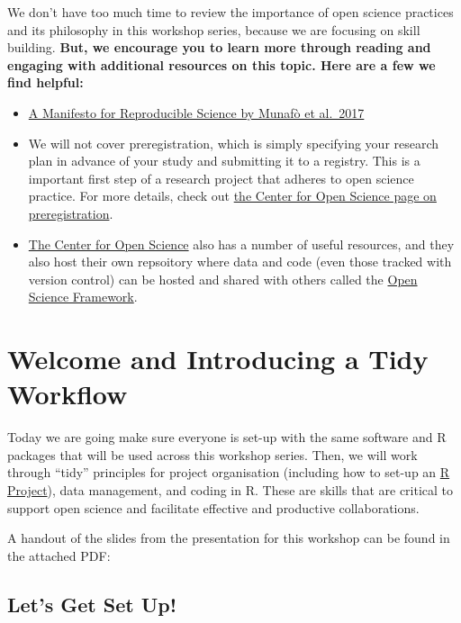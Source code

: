 \documentclass[
]{book}
\begin{document}
We don't have too much time to review the importance of open science practices and its philosophy in this workshop series, because we are focusing on skill building. \textbf{But, we encourage you to learn more through reading and engaging with additional resources on this topic. Here are a few we find helpful:}

\begin{itemize}
\item
  \href{https://www.nature.com/articles/s41562-016-0021}{A Manifesto for Reproducible Science by Munafò et al.~2017}
\item
  We will not cover preregistration, which is simply specifying your research plan in advance of your study and submitting it to a registry. This is a important first step of a research project that adheres to open science practice. For more details, check out \href{https://www.cos.io/initiatives/prereg?_ga=2.263330764.1195627208.1585935801-1853960792.1572623623.}{the Center for Open Science page on preregistration}.
\item
  \href{https://www.cos.io/open-science}{The Center for Open Science} also has a number of useful resources, and they also host their own repsoitory where data and code (even those tracked with version control) can be hosted and shared with others called the \href{https://osf.io/}{Open Science Framework}.
\end{itemize}

\chapter{Welcome and Introducing a Tidy Workflow}\label{welcome-and-introducing-a-tidy-workflow}

Today we are going make sure everyone is set-up with the same software and R packages that will be used across this workshop series. Then, we will work through ``tidy'' principles for project organisation (including how to set-up an \href{https://r4np.com/06_starting_r_projects.html}{R Project}), data management, and coding in R. These are skills that are critical to support open science and facilitate effective and productive collaborations.

A handout of the slides from the presentation for this workshop can be found in the attached PDF:

\section{Let's Get Set Up!}\label{lets-get-set-up}
\end{document}
